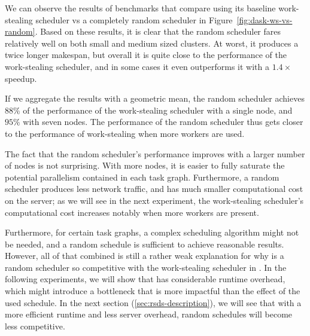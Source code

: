 We can observe the results of benchmarks that compare \dask{} using its
baseline work-stealing scheduler vs a completely random scheduler in
Figure~\ref{fig:dask-ws-vs-random}. Based on these results, it is clear that the random scheduler
fares relatively well on both small and medium sized clusters. At worst, it produces a twice longer
makespan, but overall it is quite close to the performance of the work-stealing scheduler, and in
some cases it even outperforms it with a $1.4\times$ speedup.

If we aggregate the results with a geometric mean, the random scheduler achieves
$88\%$ of the performance of the work-stealing scheduler with a single node,
and $95\%$ with seven nodes. The performance of the random scheduler thus gets
closer to the performance of work-stealing when more workers are used.

The fact that the random scheduler's performance improves with a larger number of nodes is not
surprising. With more nodes, it is easier to fully saturate the potential parallelism contained in
each task graph. Furthermore, a random scheduler produces less network traffic, and has much
smaller computational cost on the server; as we will see in the next experiment, the work-stealing
scheduler's computational cost increases notably when more workers are present.

Furthermore, for certain task graphs, a complex scheduling algorithm might not be needed, and a
random schedule is sufficient to achieve reasonable results. However, all of that combined is still
a rather weak explanation for why is a random scheduler so competitive with the work-stealing
scheduler in \dask{}. In the following experiments, we will show that
\dask{} has considerable runtime overhead, which might introduce a bottleneck
that is more impactful than the effect of the used schedule. In the next section
(\ref{sec:rsds-description}), we will see that with a more efficient runtime and less server
overhead, random schedules will become less competitive.


